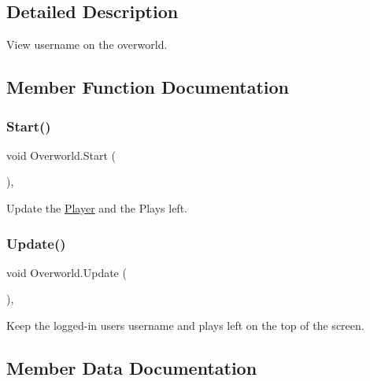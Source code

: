 \subsection{Detailed Description}
View username on the overworld. 

\subsection{Member Function Documentation}
\mbox{\label{class_overworld_a1065dc87edcf287032a56809584feeab}} 
\subsubsection{\texorpdfstring{Start()}{Start()}}
{\footnotesize\ttfamily void Overworld.\+Start (\begin{DoxyParamCaption}{ }\end{DoxyParamCaption})\hspace{0.3cm}{\ttfamily [inline]}, {\ttfamily [private]}}



Update the \mbox{\hyperlink{class_player}{Player}} and the Plays left. 

\mbox{\label{class_overworld_ad5db914c45c35f2c23d3f03cec2117f9}} 
\subsubsection{\texorpdfstring{Update()}{Update()}}
{\footnotesize\ttfamily void Overworld.\+Update (\begin{DoxyParamCaption}{ }\end{DoxyParamCaption})\hspace{0.3cm}{\ttfamily [inline]}, {\ttfamily [private]}}



Keep the logged-\/in user\textquotesingle{}s username and plays left on the top of the screen. 



\subsection{Member Data Documentation}
\mbox{\label{class_overworld_ac71b777e9c447e4a637bcc6a2b30499a}} 
